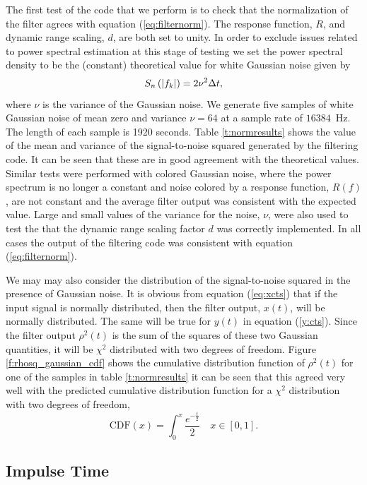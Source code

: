 The first test of the code that we perform is to check that the normalization
of the filter agrees with equation (\ref{eq:filternorm}). The response
function, $R$, and dynamic range scaling, $d$, are both set to unity. In order
to exclude issues related to power spectral estimation at this stage of
testing  we set the power spectral density to be the (constant) theoretical
value for white Gaussian noise given by
\begin{equation}
S_n\left(\left|f_{k}\right|\right) = 2 \nu^2 \Delta t,
\label{eq:gaussianpsd}
\end{equation}
where $\nu$ is the variance of the Gaussian noise.  We generate five samples
of white Gaussian noise of mean zero and variance $\nu = 64$ at a sample rate
of $16384$~Hz. The length of each sample is 1920 seconds. Table
\ref{t:normresults} shows the value of the mean and variance of the
signal-to-noise squared generated by the filtering code. It can be seen that
these are in good agreement with the theoretical values. Similar tests were
performed with colored Gaussian noise, where the power spectrum is no longer a
constant and noise colored by a response function, $R(f)$, are not constant
and the average filter output was consistent with the expected value.  Large
and small values of the variance for the noise, $\nu$, were also used to test
the that the dynamic range scaling factor $d$ was correctly implemented. In
all cases the output of the filtering code was consistent with equation
(\ref{eq:filternorm}).

We may may also consider the distribution of the signal-to-noise squared in
the presence of Gaussian noise. It is obvious from equation (\ref{eq:xcts})
that if the input signal is normally distributed, then the filter output,
$x(t)$, will be normally distributed. The same will be true for $y(t)$ in
equation (\ref{y:cts}). Since the filter output $\rho^2(t)$ is the sum of the
squares of these two Gaussian quantities, it will be $\chi^2$ distributed with
two degrees of freedom. Figure \ref{f:rhosq_gaussian_cdf} shows the cumulative
distribution function of $\rho^2(t)$ for one of the samples in table
\ref{t:normresults} it can be seen that this agreed very well with the
predicted cumulative distribution function for a $\chi^2$ distribution with
two degrees of freedom,
\begin{equation}
\mathrm{CDF}(x) = \int_0^x \frac{e^{-\frac{t}{2}}}{2} \quad x \in [0,1].
\end{equation}

\subsection{Impulse Time}
\label{ss:impulsetime}

